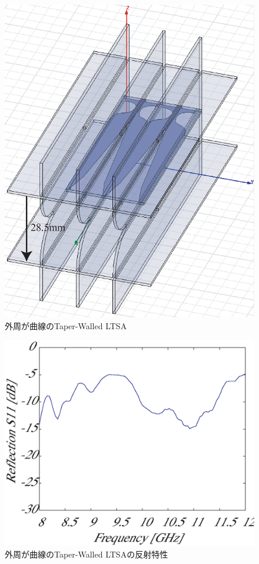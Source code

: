 ﻿\documentclass[12pt,oneside]{jsbook}
\begin{document}
\begin{figure}[t]
\begin{center}
\includegraphics[width =\hsize]{curvedantenna2.eps}
\caption{外周が曲線のTaper-Walled LTSA} \label{curved} 
\end{center}
\end{figure}

\begin{figure}[t]
\begin{center}
\includegraphics[width =\hsize]{oldantenna_S11.eps}
\caption{外周が曲線のTaper-Walled LTSAの反射特性}
\label{old-solo-S11}
\end{center}
\end{figure}
\end{document}

